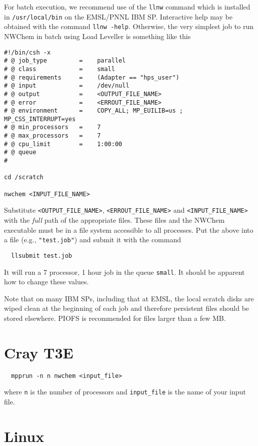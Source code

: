 For batch execution, we recommend use of the \verb+llnw+ command which
is installed in \verb+/usr/local/bin+ on the EMSL/PNNL IBM SP.
Interactive help may be obtained with the command \verb+llnw -help+.
Otherwise, the very simplest job to run NWChem in batch using Load
Leveller is something like this
\begin{verbatim}
#!/bin/csh -x
# @ job_type         =    parallel
# @ class            =    small
# @ requirements     =    (Adapter == "hps_user")
# @ input            =    /dev/null
# @ output           =    <OUTPUT_FILE_NAME>
# @ error            =    <ERROUT_FILE_NAME>
# @ environment      =    COPY_ALL; MP_EUILIB=us ; MP_CSS_INTERRUPT=yes
# @ min_processors   =    7
# @ max_processors   =    7
# @ cpu_limit        =    1:00:00
# @ queue
#

cd /scratch

nwchem <INPUT_FILE_NAME>
\end{verbatim}

Substitute \verb+<OUTPUT_FILE_NAME>+, \verb+<ERROUT_FILE_NAME>+ and
\verb+<INPUT_FILE_NAME>+ with the {\em full} path of the appropriate
files.  These files and the NWChem executable must be in a file system
accessible to all processes.  Put the above into a file (e.g.,
\verb+"test.job"+) and submit it with the command
\begin{verbatim}
  llsubmit test.job
\end{verbatim}
It will run a 7 processor, 1 hour job in the queue \verb+small+.  It
should be apparent how to change these values.

Note that on many IBM SPs, including that at EMSL, the local scratch
disks are wiped clean at the beginning of each job and therefore
persistent files should be stored elsewhere.  PIOFS is recommended for
files larger than a few MB.

\section{Cray T3E}

\begin{verbatim}
  mpprun -n n nwchem <input_file>
\end{verbatim}

where \verb+n+ is the number of processors and \verb+input_file+ is the
name of your input file.

\section{Linux}

